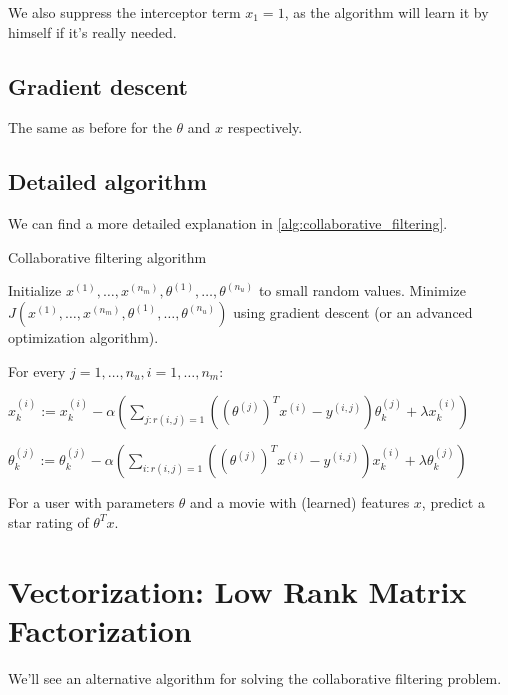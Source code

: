 \documentclass[10pt]{extarticle}
\begin{document}
We also suppress the interceptor term $x_1 = 1$, as the algorithm will
learn it by himself if it's really needed.

\subsection{Gradient descent}\label{gradient-descent}

The same as before for the $\theta$ and $x$ respectively.

\subsection{Detailed algorithm}\label{detailed-algorithm}

We can find a more detailed explanation in
\cref{alg:collaborative_filtering}.

\begin{algorithm}
\caption{Collaborative filtering algorithm} \label{alg:collaborative_filtering}
\begin{algorithmic}[1]
\State Initialize $x^{(1)}, \dots, x^{(n_m)}, \theta^{(1)}, \dots, \theta^{(n_u)}$ to small random values.
\State Minimize $J(x^{(1)}, \dots, x^{(n_m)}, \theta^{(1)}, \dots, \theta^{(n_u)})$ using gradient descent (or an advanced optimization algorithm).

For every $j = 1, \dots, n_u, i = 1, \dots, n_m$:

$ x_k^{(i)} := x_k^{(i)} - \alpha \left( \sum_{j:r(i, j)=1} \left( (\theta^{(j)})^Tx^{(i)} - y^{(i,j)}\right) \theta_k^{(j)} + \lambda x_k^{(i)} \right) $

$ \theta_k^{(j)} := \theta_k^{(j)} - \alpha \left( \sum_{i:r(i, j)=1} \left( (\theta^{(j)})^Tx^{(i)} - y^{(i,j)}\right) x_k^{(i)} + \lambda\theta_k^{(j)} \right) $

\State For a user with parameters $\theta$ and a movie with (learned) features $x$, predict a star rating of $\theta^Tx$.

\end{algorithmic}
\end{algorithm}

\section{Vectorization: Low Rank Matrix
Factorization}\label{vectorization-low-rank-matrix-factorization}

We'll see an alternative algorithm for solving the collaborative
filtering problem. \bigskip
\end{document}
